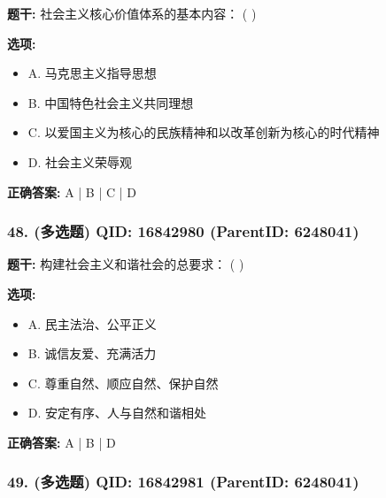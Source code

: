 \documentclass[12pt,UTF8]{ctexart}
\begin{document}
\textbf{题干:}
社会主义核心价值体系的基本内容： ( )



\textbf{选项:}
\begin{itemize}[leftmargin=*]

  \item A. 马克思主义指导思想

  \item B. 中国特色社会主义共同理想

  \item C. 以爱国主义为核心的民族精神和以改革创新为核心的时代精神

  \item D. 社会主义荣辱观

\end{itemize}

\textbf{正确答案:}
A | B | C | D

\vspace{0.3em}\hrulefill\vspace{0.7em}

\subsubsection*{48. (多选题) \small QID: 16842980 (ParentID: 6248041)}

\textbf{题干:}
构建社会主义和谐社会的总要求： ( )



\textbf{选项:}
\begin{itemize}[leftmargin=*]

  \item A. 民主法治、公平正义

  \item B. 诚信友爱、充满活力

  \item C. 尊重自然、顺应自然、保护自然

  \item D. 安定有序、人与自然和谐相处

\end{itemize}

\textbf{正确答案:}
A | B | D

\vspace{0.3em}\hrulefill\vspace{0.7em}

\subsubsection*{49. (多选题) \small QID: 16842981 (ParentID: 6248041)}
\end{document}
